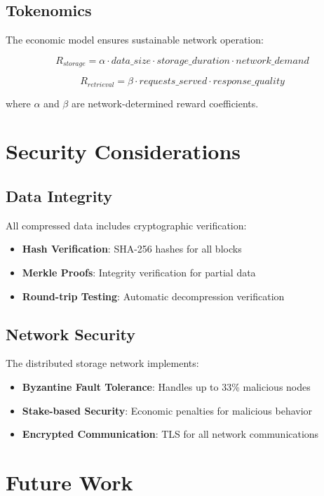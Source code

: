 \documentclass[11pt,a4paper]{article}
\begin{document}
\subsection{Tokenomics}

The economic model ensures sustainable network operation:

$$
R_{storage} = \alpha \cdot data\_size \cdot storage\_duration \cdot network\_demand
$$

$$
R_{retrieval} = \beta \cdot requests\_served \cdot response\_quality
$$

where $\alpha$ and $\beta$ are network-determined reward coefficients.

\section{Security Considerations}

\subsection{Data Integrity}

All compressed data includes cryptographic verification:
\begin{itemize}
    \item \textbf{Hash Verification}: SHA-256 hashes for all blocks
    \item \textbf{Merkle Proofs}: Integrity verification for partial data
    \item \textbf{Round-trip Testing}: Automatic decompression verification
\end{itemize}

\subsection{Network Security}

The distributed storage network implements:
\begin{itemize}
    \item \textbf{Byzantine Fault Tolerance}: Handles up to 33\% malicious nodes
    \item \textbf{Stake-based Security}: Economic penalties for malicious behavior
    \item \textbf{Encrypted Communication}: TLS for all network communications
\end{itemize}

\section{Future Work}
\end{document}
